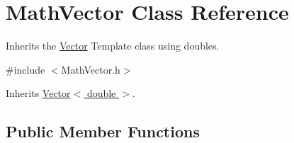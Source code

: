 \hypertarget{class_math_vector}{\section{Math\-Vector Class Reference}
\label{class_math_vector}
}


Inherits the \hyperlink{class_vector}{Vector} Template class using doubles.  




{\ttfamily \#include $<$Math\-Vector.\-h$>$}



Inherits \hyperlink{class_vector}{Vector$<$ double $>$}.

\subsection*{Public Member Functions}
